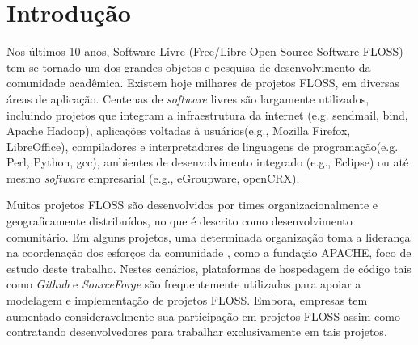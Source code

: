 \chapter{Introdução}
\label{chapter:intro}


Nos últimos 10 anos, Software Livre (Free/Libre Open-Source    Software FLOSS) tem se tornado um dos grandes objetos e pesquisa de desenvolvimento da comunidade acadêmica. Existem hoje milhares de projetos FLOSS, em diversas áreas de aplicação. Centenas de \textit{software} livres são largamente utilizados, incluindo projetos que integram a infraestrutura da internet (e.g. sendmail, bind, Apache Hadoop), aplicações voltadas à usuários(e.g., Mozilla Firefox, LibreOffice), compiladores e interpretadores de linguagens de programação(e.g. Perl, Python, gcc), ambientes de desenvolvimento integrado (e.g., Eclipse) ou até mesmo \textit{software} empresarial (e.g., eGroupware, openCRX).


Muitos projetos FLOSS são desenvolvidos por times organizacionalmente e geograficamente distribuídos, no que é descrito como desenvolvimento comunitário\cite{lee2003firm}. Em alguns projetos, uma determinada organização toma a liderança na coordenação dos esforços da comunidade \cite{fitzgerald2006transformation}, como a fundação APACHE, foco de estudo deste trabalho. Nestes cenários, plataformas de hospedagem de código tais como \textit{Github} e \textit{SourceForge} são frequentemente utilizadas para apoiar a modelagem e implementação de projetos FLOSS. Embora, empresas tem aumentado consideravelmente sua participação em projetos FLOSS assim como contratando  desenvolvedores para trabalhar exclusivamente em tais projetos\cite{lakhaniwolf}.


